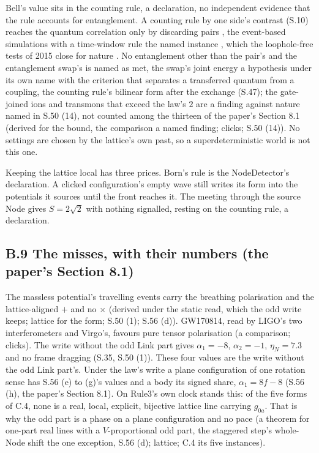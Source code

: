 \documentclass[pdflatex,sn-mathphys-num]{sn-jnl}
\theoremstyle{thmstyleone}
\begin{document}
Bell's value sits in the counting rule, a declaration, no independent evidence that the rule accounts for entanglement. A counting rule by one side's contrast (S.10) reaches the quantum correlation only by discarding pairs \cite{pearle}\cite{eberhard}\cite{gargmermin}, the event-based simulations with a time-window rule the named instance \cite{deraedt2007}\cite{michielsen2014}, which the loophole-free tests of 2015 close for nature \cite{hensen}\cite{giustina}\cite{shalm}. No entanglement other than the pair's and the entanglement swap's is named as met, the swap's joint energy a hypothesis under its own name with the criterion that separates a transferred quantum from a coupling, the counting rule's bilinear form after the exchange (S.47); the gate-joined ions and transmons that exceed the law's $2$ are a finding against nature named in S.50 (14), not counted among the thirteen of the paper's Section 8.1 (derived for the bound, the comparison a named finding; clicks; S.50 (14)). No settings are chosen by the lattice's own past, so a superdeterministic world \cite{hossenfelder} is not this one.

Keeping the lattice local has three prices. Born's rule is the NodeDetector's declaration. A clicked configuration's empty wave still writes its form into the potentials it sources until the front reaches it. The meeting through the source Node gives $S = 2\sqrt 2$ with nothing signalled, resting on the counting rule, a declaration.

\subsection*{B.9 The misses, with their numbers (the paper's Section 8.1)}

The massless potential's travelling events carry the breathing polarisation and the lattice-aligned $+$ and no $\times$ (derived under the static read, which the odd write keeps; lattice for the form; S.50 (1); S.56 (d)). GW170814, read by LIGO's two interferometers and Virgo's, favours pure tensor polarisation \cite{gw170814} (a comparison; clicks). The write without the odd Link part gives $\alpha_1 = -8$, $\alpha_2 = -1$, $\eta_N = 7.3$ and no frame dragging (S.35, S.50 (1)). These four values are the write without the odd Link part's. Under the law's write a plane configuration of one rotation sense has S.56 (e) to (g)'s values and a body its signed share, $\alpha_1 = 8f - 8$ (S.56 (h), the paper's Section 8.1). On Rule3's own clock stands this: of the five forms of C.4, none is a real, local, explicit, bijective lattice line carrying $g_{0a}$. That is why the odd part is a phase on a plane configuration and no pace (a theorem for one-part real lines with a $V$-proportional odd part, the staggered step's whole-Node shift the one exception, S.56 (d); lattice; C.4 its five instances).
\end{document}
